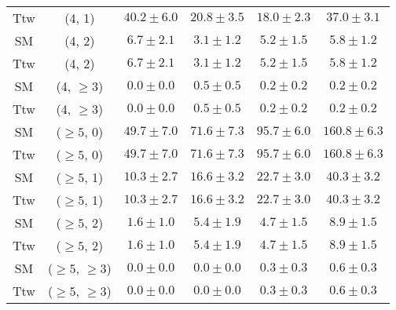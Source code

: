 \begin{table}[h!]
{\begin{tabular}{cccccc}
	Ttw & (4, 1) & $40.2\pm 6.0$ & $20.8\pm 3.5$ & $18.0\pm 2.3$ & $37.0\pm 3.1$ \\[0.5ex] 
	SM & (4, 2) & $6.7\pm 2.1$ & $3.1\pm 1.2$ & $5.2\pm 1.5$ & $5.8\pm 1.2$ \\[0.5ex] 
	Ttw & (4, 2) & $6.7\pm 2.1$ & $3.1\pm 1.2$ & $5.2\pm 1.5$ & $5.8\pm 1.2$ \\[0.5ex] 
	SM & (4, $\ge3$) & $0.0\pm 0.0$ & $0.5\pm 0.5$ & $0.2\pm 0.2$ & $0.2\pm 0.2$ \\[0.5ex] 
	Ttw & (4, $\ge3$) & $0.0\pm 0.0$ & $0.5\pm 0.5$ & $0.2\pm 0.2$ & $0.2\pm 0.2$ \\[0.5ex] 
	SM & ($\ge5$, 0) & $49.7\pm 7.0$ & $71.6\pm 7.3$ & $95.7\pm 6.0$ & $160.8\pm 6.3$ \\[0.5ex] 
	Ttw & ($\ge5$, 0) & $49.7\pm 7.0$ & $71.6\pm 7.3$ & $95.7\pm 6.0$ & $160.8\pm 6.3$ \\[0.5ex] 
	SM & ($\ge5$, 1) & $10.3\pm 2.7$ & $16.6\pm 3.2$ & $22.7\pm 3.0$ & $40.3\pm 3.2$ \\[0.5ex] 
	Ttw & ($\ge5$, 1) & $10.3\pm 2.7$ & $16.6\pm 3.2$ & $22.7\pm 3.0$ & $40.3\pm 3.2$ \\[0.5ex] 
	SM & ($\ge5$, 2) & $1.6\pm 1.0$ & $5.4\pm 1.9$ & $4.7\pm 1.5$ & $8.9\pm 1.5$ \\[0.5ex] 
	Ttw & ($\ge5$, 2) & $1.6\pm 1.0$ & $5.4\pm 1.9$ & $4.7\pm 1.5$ & $8.9\pm 1.5$ \\[0.5ex] 
	SM & ($\ge5$, $\ge3$) & $0.0\pm 0.0$ & $0.0\pm 0.0$ & $0.3\pm 0.3$ & $0.6\pm 0.3$ \\[0.5ex] 
	Ttw & ($\ge5$, $\ge3$) & $0.0\pm 0.0$ & $0.0\pm 0.0$ & $0.3\pm 0.3$ & $0.6\pm 0.3$ \\[0.5ex] 
	\hline
	\hline
\end{tabular}}
\end{table}
